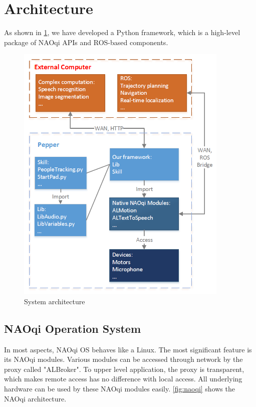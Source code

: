 \section{Architecture}
\label{sec:architecture}

As shown in \ref{fig:archi}, we have developed a Python framework, which is a high-level package of NAOqi APIs and ROS-based components. 
\begin{figure}[!h]
    \centering
    \includegraphics[width=4in]{figs/architecture.png}
    \caption{System architecture}
    \label{fig:archi}
\end{figure}

\subsection{NAOqi Operation System}
\label{subsec:naoqi}
In most aspects, NAOqi OS behaves like a Linux.
The most significant feature is its NAOqi modules.
Various modules can be accessed through network by the proxy called "ALBroker".
To upper level application, the proxy is transparent, which makes remote access has no difference with local access.
All underlying hardware can be used by these NAOqi modules easily.
\ref{fig:naoqi} shows the NAOqi architecture.

